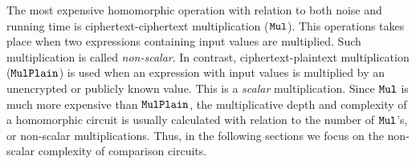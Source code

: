 The most expensive homomorphic operation with relation to both noise and running time is ciphertext-ciphertext multiplication (${\mathtt{Mul}}$).
This operations takes place when two expressions containing input values are multiplied.
Such multiplication is called \emph{non-scalar}.
In contrast, ciphertext-plaintext multiplication (${\mathtt{MulPlain}}$) is used when an expression with input values is multiplied by an unencrypted or publicly known value.
This is a \emph{scalar} multiplication.
Since ${\mathtt{Mul}}$ is much more expensive than ${\mathtt{MulPlain}}$, the multiplicative depth and complexity of a homomorphic circuit is usually calculated with relation to the number of ${\mathtt{Mul}}$'s, or non-scalar multiplications.
Thus, in the following sections we focus on the non-scalar complexity of comparison circuits.


